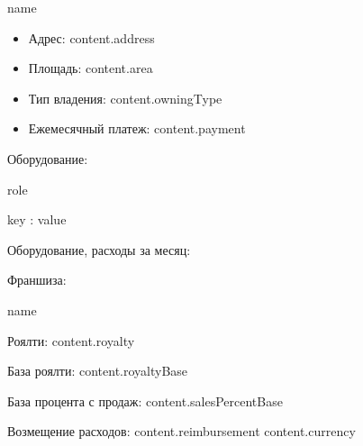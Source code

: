 \documentclass[a4paper,12pt]{article}
\begin{document}
{{{{{{{{{{{{{{{%
  {%
    {{ name }}

    \begin{itemize}
    \item Адрес: {{ content.address }}
    \item Площадь: {{ content.area }}
    \item Тип владения: {{ content.owningType }}
    \item Ежемесячный платеж: {{ content.payment }}
    \end{itemize}
    {%
    Оборудование:
    {%
    {%
      {%
      {{ role }}
        {%
        {{ key }}: {{ value }}

        {%
      {%
    {%

    Оборудование, расходы за месяц:

  {%
{%

{%
Франшиза:
  {%
      {{ name }}

      Роялти: {{ content.royalty }}
      
      База роялти: {{ content.royaltyBase }}
      
      База процента с продаж: {{ content.salesPercentBase }}

      Возмещение расходов: {{ content.reimbursement }} {{ content.currency }}
  {%
{%

}}}}}}}}}}}}}}}}}}}}}}}}}}}}}}
\end{document}

